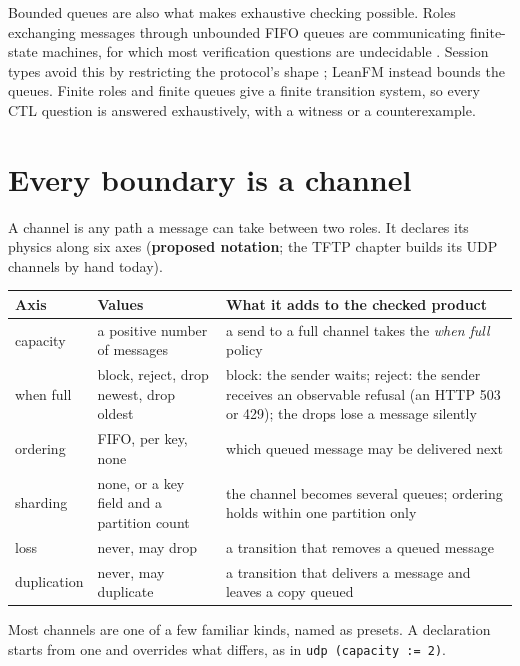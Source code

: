 Bounded queues are also what makes exhaustive checking possible. Roles exchanging
messages through unbounded FIFO queues are communicating finite-state machines,
for which most verification questions are undecidable
\citep{brand1983communicating}. Session types avoid this by restricting the
protocol's shape \citep{denielou2012communicating}; LeanFM instead bounds the
queues. Finite roles and finite queues give a finite transition system, so every
CTL question is answered exhaustively, with a witness or a counterexample.

\section{Every boundary is a channel}

A channel is any path a message can take between two roles. It declares its
physics along six axes (\textbf{proposed notation}; the TFTP chapter builds its
UDP channels by hand today).

\begin{center}
\small
\begin{tabular}{@{}p{}p{}p{}@{}}
\toprule
Axis & Values & What it adds to the checked product \\
\midrule
capacity & a positive number of messages & a send to a full channel takes the \emph{when full} policy \\
when full & block, reject, drop newest, drop oldest & block: the sender waits; reject: the sender receives an observable refusal (an HTTP 503 or 429); the drops lose a message silently \\
ordering & FIFO, per key, none & which queued message may be delivered next \\
sharding & none, or a key field and a partition count & the channel becomes several queues; ordering holds within one partition only \\
loss & never, may drop & a transition that removes a queued message \\
duplication & never, may duplicate & a transition that delivers a message and leaves a copy queued \\
\bottomrule
\end{tabular}
\end{center}

Most channels are one of a few familiar kinds, named as presets. A declaration
starts from one and overrides what differs, as in \texttt{udp (capacity := 2)}.

